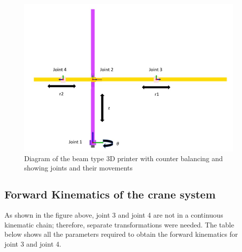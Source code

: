 \documentclass{UoNMCHA}
\numberwithin{equation}{section}
\begin{document}
	\begin{figure}[H]
		\begin{center}
			\includegraphics[width=.8\linewidth]{figs/Picture6}
			\caption{Diagram of the beam type 3D printer with counter balancing and showing joints and their movements}
			\label{figs/Picture6}
		\end{center}
	\end{figure}
	
	\subsection{Forward Kinematics of the crane system}
	
	As shown in the figure above, joint 3 and joint 4 are not in a continuous kinematic chain; therefore, separate transformations were needed.  The table below shows all the parameters required to obtain the forward kinematics for joint 3 and joint 4.
	
\end{document}
